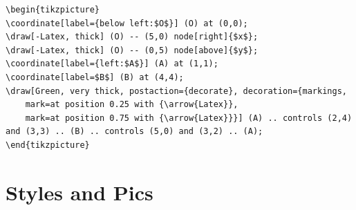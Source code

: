 \begin{Answer}
\begin{lstlisting}
\begin{tikzpicture}
\coordinate[label={below left:$O$}] (O) at (0,0);
\draw[-Latex, thick] (O) -- (5,0) node[right]{$x$};
\draw[-Latex, thick] (O) -- (0,5) node[above]{$y$};
\coordinate[label={left:$A$}] (A) at (1,1);
\coordinate[label=$B$] (B) at (4,4);
\draw[Green, very thick, postaction={decorate}, decoration={markings,
    mark=at position 0.25 with {\arrow{Latex}},
    mark=at position 0.75 with {\arrow{Latex}}}] (A) .. controls (2,4) and (3,3) .. (B) .. controls (5,0) and (3,2) .. (A);
\end{tikzpicture} 
\end{lstlisting}
\end{Answer}

\section{Styles and Pics}
\label{sec:stylepic}

